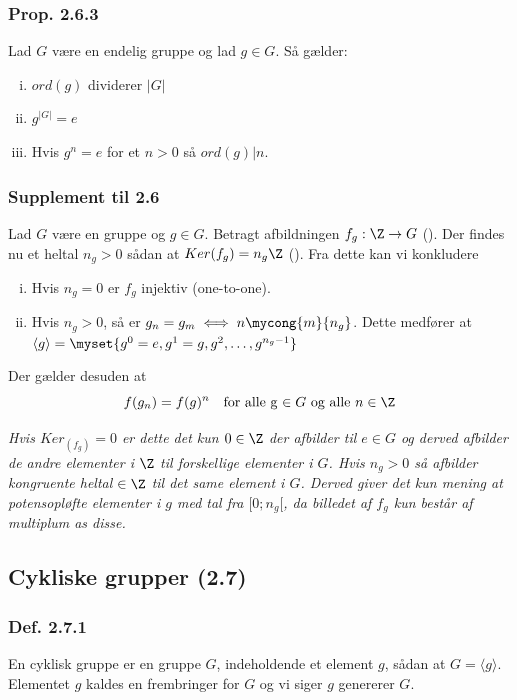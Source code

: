 \subsubsection{Prop. 2.6.3}
Lad $G$ være en endelig gruppe og lad $g \in G$. Så gælder:
\begin{enumerate}[(i)]
  \item $ord(g)$ dividerer $|G|$
  \item $g^{|G|} = e$
  \item Hvis $g^n = e$ for et $n > 0$ så $ord(g)|n$.
\end{enumerate}

\subsubsection{Supplement til 2.6}
Lad $G$ være en gruppe og $g \in G$. Betragt afbildningen $f_g: \Z \rightarrow
G$ (). Der findes nu et heltal $n_g > 0$ sådan at $Ker(f_g) = n_g\Z$
(). Fra dette kan vi konkludere
\begin{enumerate}[(i)]
  \item Hvis $n_g = 0$ er $f_g$ injektiv (one-to-one).
  \item Hvis $n_g > 0$, så er $g_n = g_m \iff n \mycong{m}{n_g}$. Dette medfører
  at
  \\
  $\langle g \rangle = \myset{g^0 = e, g^1 = g, g^2, \ldots, g^{n_g -1} }$
\end{enumerate}

Der gælder desuden at
\begin{equation*}
  f(g_n) = f(g)^n \quad \text{for alle g $\in G$ og alle $n \in \Z$}
\end{equation*}

\textit{Hvis $Ker_(f_g) = {0}$ er dette det kun $0 \in \Z$ der afbilder til $e
\in G$ og derved afbilder de andre elementer i $\Z$ til forskellige elementer i
$G$. Hvis $n_g > 0$ så afbilder kongruente heltal $\in \Z$ til det same element
i $G$. Derved giver det kun mening at potensopløfte elementer i $g$ med tal fra
$[0;n_g[$, da billedet af $f_g$ kun består af multiplum as disse.}

\subsection{Cykliske grupper (2.7)}
\subsubsection{Def. 2.7.1}
En cyklisk gruppe er en gruppe $G$, indeholdende et element $g$, sådan at $G =
\langle g \rangle$. Elementet $g$ kaldes en frembringer for $G$ og vi siger $g$
genererer $G$.

